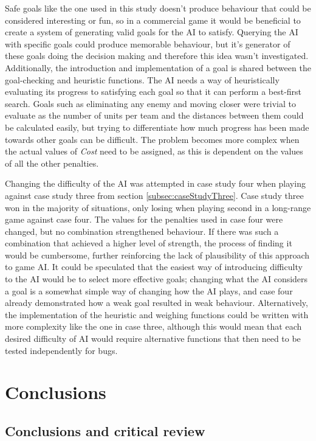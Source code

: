 \documentclass[11pt, a4paper]{report}
\begin{document}
Safe goals like the one used in this study doesn't produce behaviour that could be considered interesting or fun, so in a commercial game it would be beneficial to create a system of generating valid goals for the AI to satisfy. Querying the AI with specific goals could produce memorable behaviour, but it's generator of these goals doing the decision making and therefore this idea wasn't investigated. Additionally, the introduction and implementation of a goal is shared between the goal-checking and heuristic functions. The AI needs a way of heuristically evaluating its progress to satisfying each goal so that it can perform a best-first search. Goals such as eliminating any enemy and moving closer were trivial to evaluate as the number of units per team and the distances between them could be calculated easily, but trying to differentiate how much progress has been made towards other goals can be difficult. The problem becomes more complex when the actual values of \emph{Cost} need to be assigned, as this is dependent on the values of all the other penalties.

Changing the difficulty of the AI was attempted in case study four when playing against case study three from section \ref{subsec:caseStudyThree}. Case study three won in the majority of situations, only losing when playing second in a long-range game against case four. The values for the penalties used in case four were changed, but no combination strengthened behaviour. If there was such a combination that achieved a higher level of strength, the process of finding it would be cumbersome, further reinforcing the lack of plausibility of this approach to game AI. It could be speculated that the easiest way of introducing difficulty to the AI would be to select more effective goals; changing what the AI considers a goal is a somewhat simple way of changing how the AI plays, and case four already demonstrated how a weak goal resulted in weak behaviour. Alternatively, the implementation of the heuristic and weighing functions could be written with more complexity like the one in case three, although this would mean that each desired difficulty of AI would require alternative functions that then need to be tested independently for bugs.

\chapter{Conclusions}
\label{chapter:conclusions}

\section{Conclusions and critical review}
\label{sec:conclusionsAndCriticalReview}
\end{document}
